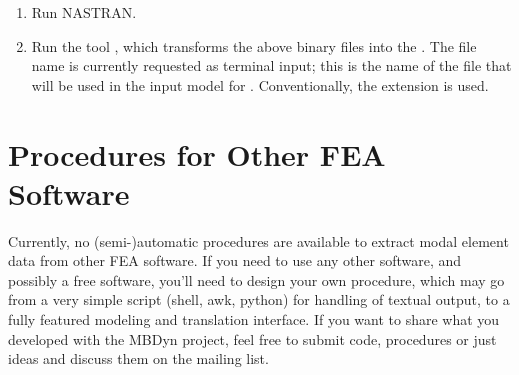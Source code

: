 \begin{enumerate}
\item Run NASTRAN.


\item Run the tool , which transforms the above binary files
into the .
The file name is currently requested as terminal input; this is the name 
of the file that will be used in the input model for .
Conventionally, the  extension is used.

\end{enumerate} %



\section{Procedures for Other FEA Software}
Currently, no (semi-)automatic procedures are available to extract modal
element data from other FEA software.
If you need to use any other software, and possibly a free software,
you'll need to design your own procedure, which may go from a very simple
script (shell, awk, python) for handling of textual output, to a fully
featured modeling and translation interface.
If you want to share what you developed with the MBDyn project, feel free
to submit code, procedures or just ideas and discuss them on the
mailing list.


